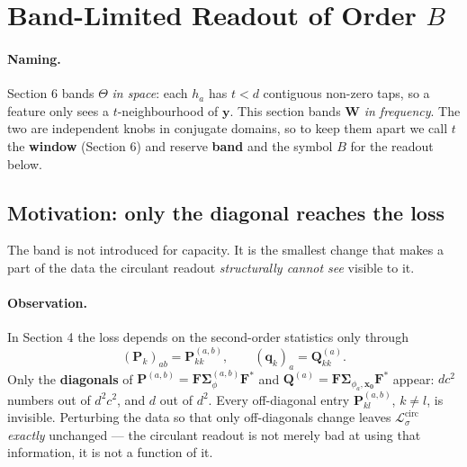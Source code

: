 
\section{Band-Limited Readout of Order $B$}

\paragraph{Naming.} Section 6 bands $\Theta$ \emph{in space}: each $h_{a}$ has
$t<d$ contiguous non-zero taps, so a feature only sees a $t$-neighbourhood of
$\boldsymbol{y}$. This section bands $\boldsymbol{W}$ \emph{in frequency}. The two
are independent knobs in conjugate domains, so to keep them apart we call $t$ the
\textbf{window} (Section 6) and reserve \textbf{band} and the symbol $B$ for the
readout below.

\subsection{Motivation: only the diagonal reaches the loss}

The band is not introduced for capacity. It is the smallest change that makes a part
of the data the circulant readout \emph{structurally cannot see} visible to it.

\paragraph{Observation.} In Section 4 the loss depends on the second-order statistics
only through
\[
(\mathbf{P}_{k})_{ab}=\boldsymbol{P}^{(a,b)}_{kk},
\qquad
(\mathbf{q}_{k})_{a}=\boldsymbol{Q}^{(a)}_{kk}.
\]
Only the \textbf{diagonals} of $\boldsymbol{P}^{(a,b)}=\boldsymbol{F}\boldsymbol{\Sigma}^{(a,b)}_{\phi}\boldsymbol{F}^{*}$
and $\boldsymbol{Q}^{(a)}=\boldsymbol{F}\boldsymbol{\Sigma}_{\phi_{a},\boldsymbol{x_{0}}}\boldsymbol{F}^{*}$
appear: $dc^{2}$ numbers out of $d^{2}c^{2}$, and $d$ out of $d^{2}$. Every off-diagonal
entry $\boldsymbol{P}^{(a,b)}_{kl}$, $k\ne l$, is invisible. Perturbing the data so that
only off-diagonals change leaves $\mathcal{L}^{\text{circ}}_{\sigma}$ \emph{exactly}
unchanged --- the circulant readout is not merely bad at using that information, it is
not a function of it.

